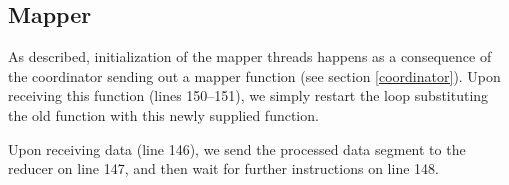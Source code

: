 \subsection{Mapper}
As described, initialization of the mapper threads happens as a consequence of
the coordinator sending out a mapper function (see section \ref{coordinator}).
Upon receiving this function (lines 150--151), we simply restart the loop
substituting the old function with this newly supplied function.


Upon receiving data (line 146), we send the processed data segment to the
reducer on line 147, and then wait for further instructions on line 148.
